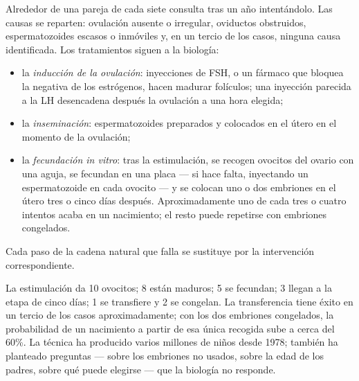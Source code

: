 \begin{proposition}\label{prop:g11:hormones-and-reproduction:art}
Alrededor de una pareja de cada siete consulta tras un año
intentándolo. Las causas se reparten: ovulación ausente o irregular,
oviductos obstruidos, espermatozoides escasos o inmóviles y, en un
tercio de los casos, ninguna causa identificada. Los tratamientos
siguen a la biología:
\begin{itemize}
  \item la \emph{inducción de la ovulación}: inyecciones de FSH, o un
        fármaco que bloquea la  negativa de los
        estrógenos, hacen madurar folículos; una inyección parecida a
        la LH desencadena después la ovulación a una hora elegida;
  \item la \emph{inseminación}: espermatozoides preparados y colocados
        en el útero en el momento de la ovulación;
  \item la \emph{fecundación in vitro}: tras la estimulación, se
        recogen ovocitos del ovario con una aguja, se fecundan en una
        placa --- si hace falta, inyectando un espermatozoide en cada
        ovocito --- y se colocan uno o dos embriones en el útero tres o
        cinco días después. Aproximadamente uno de cada tres o cuatro
        intentos acaba en un nacimiento; el resto puede repetirse con
        embriones congelados.
\end{itemize}
Cada paso de la cadena natural que falla se sustituye por la
intervención correspondiente.
\end{proposition}
\admitted

\begin{example}\label{ex:g11:hormones-and-reproduction:ivf}
La estimulación da 10 ovocitos; 8 están maduros; 5 se fecundan; 3
llegan a la etapa de cinco días; 1 se transfiere y 2 se congelan. La
transferencia tiene éxito en un tercio de los casos aproximadamente;
con los dos embriones congelados, la probabilidad de un nacimiento a
partir de esa única recogida sube a cerca del 60\%. La técnica ha
producido varios millones de niños desde 1978; también ha planteado
preguntas --- sobre los embriones no usados, sobre la edad de los
padres, sobre qué puede elegirse --- que la biología no responde.
\end{example}

